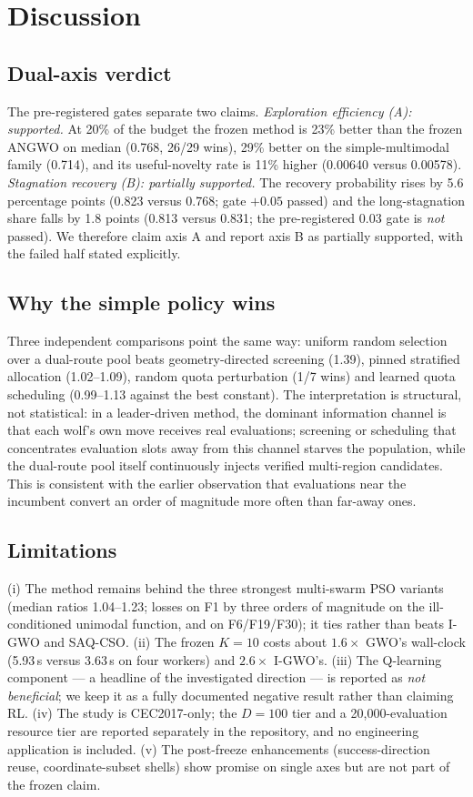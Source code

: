 \documentclass[journal]{IEEEtran}
\begin{document}
\section{Discussion}
\label{sec:discussion}
\subsection{Dual-axis verdict}
The pre-registered gates separate two claims. \emph{Exploration efficiency
(A): supported.} At 20\% of the budget the frozen method is 23\% better
than the frozen ANGWO on median (0.768, 26/29 wins), 29\% better on the
simple-multimodal family (0.714), and its useful-novelty rate is 11\%
higher (0.00640 versus 0.00578). \emph{Stagnation recovery (B): partially
supported.} The recovery probability rises by 5.6 percentage points
(0.823 versus 0.768; gate $+0.05$ passed) and the long-stagnation share
falls by 1.8 points (0.813 versus 0.831; the pre-registered $0.03$ gate is
\emph{not} passed). We therefore claim axis A and report axis B as
partially supported, with the failed half stated explicitly.

\subsection{Why the simple policy wins}
Three independent comparisons point the same way: uniform random selection
over a dual-route pool beats geometry-directed screening (1.39), pinned
stratified allocation (1.02--1.09), random quota perturbation (1/7 wins)
and learned quota scheduling (0.99--1.13 against the best constant). The
interpretation is structural, not statistical: in a leader-driven method,
the dominant information channel is that each wolf's own move receives
real evaluations; screening or scheduling that concentrates evaluation
slots away from this channel starves the population, while the dual-route
pool itself continuously injects verified multi-region candidates. This is
consistent with the earlier observation that evaluations near the incumbent
convert an order of magnitude more often than far-away ones.

\subsection{Limitations}
(i) The method remains behind the three strongest multi-swarm PSO variants
(median ratios 1.04--1.23; losses on F1 by three orders of magnitude on the
ill-conditioned unimodal function, and on F6/F19/F30); it ties rather than
beats I-GWO and SAQ-CSO. (ii) The frozen $K=10$ costs about
$1.6\times$ GWO's wall-clock (5.93\,s versus 3.63\,s on four workers) and
$2.6\times$ I-GWO's. (iii) The Q-learning component --- a headline of the
investigated direction --- is reported as \emph{not beneficial}; we keep it
as a fully documented negative result rather than claiming RL. (iv) The
study is CEC2017-only; the $D=100$ tier and a 20{,}000-evaluation resource
tier are reported separately in the repository, and no engineering
application is included. (v) The post-freeze enhancements (success-direction
reuse, coordinate-subset shells) show promise on single axes but are not
part of the frozen claim.
\end{document}
